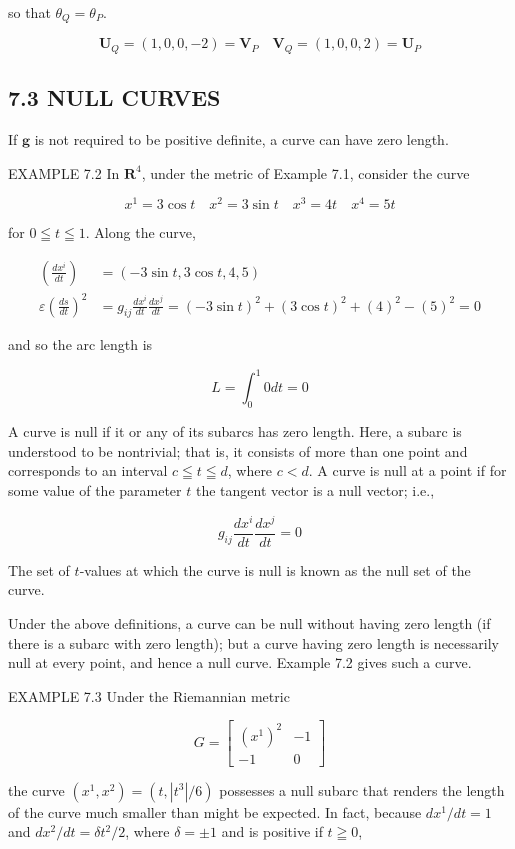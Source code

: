 \documentclass[10pt]{article}
\begin{document}
so that $\theta_{Q}=\theta_{P}$.

$$
\mathbf{U}_{Q}=(1,0,0,-2)=\mathbf{V}_{P} \quad \mathbf{V}_{Q}=(1,0,0,2)=\mathbf{U}_{P}
$$

\subsection*{7.3 NULL CURVES}
If $\mathbf{g}$ is not required to be positive definite, a curve can have zero length.

EXAMPLE 7.2 In $\mathbf{R}^{4}$, under the metric of Example 7.1, consider the curve

$$
x^{1}=3 \cos t \quad x^{2}=3 \sin t \quad x^{3}=4 t \quad x^{4}=5 t
$$

for $0 \leqq t \leqq 1$. Along the curve,

$$
\begin{aligned}
\left(\frac{d x^{i}}{d t}\right) & =(-3 \sin t, 3 \cos t, 4,5) \\
\varepsilon\left(\frac{d s}{d t}\right)^{2} & =g_{i j} \frac{d x^{i}}{d t} \frac{d x^{j}}{d t}=(-3 \sin t)^{2}+(3 \cos t)^{2}+(4)^{2}-(5)^{2}=0
\end{aligned}
$$

and so the arc length is

$$
L=\int_{0}^{1} 0 d t=0
$$

A curve is null if it or any of its subarcs has zero length. Here, a subarc is understood to be nontrivial; that is, it consists of more than one point and corresponds to an interval $c \leqq t \leqq d$, where $c<d$. A curve is null at a point if for some value of the parameter $t$ the tangent vector is a null vector; i.e.,

$$
g_{i j} \frac{d x^{i}}{d t} \frac{d x^{j}}{d t}=0
$$

The set of $t$-values at which the curve is null is known as the null set of the curve.

Under the above definitions, a curve can be null without having zero length (if there is a subarc with zero length); but a curve having zero length is necessarily null at every point, and hence a null curve. Example 7.2 gives such a curve.

EXAMPLE 7.3 Under the Riemannian metric

$$
G=\left[\begin{array}{cc}
\left(x^{1}\right)^{2} & -1 \\
-1 & 0
\end{array}\right]
$$

the curve $\left(x^{1}, x^{2}\right)=\left(t,\left|t^{3}\right| / 6\right)$ possesses a null subarc that renders the length of the curve much smaller than might be expected. In fact, because $d x^{1} / d t=1$ and $d x^{2} / d t=\delta t^{2} / 2$, where $\delta= \pm 1$ and is positive if $t \geqq 0$,
\end{document}
